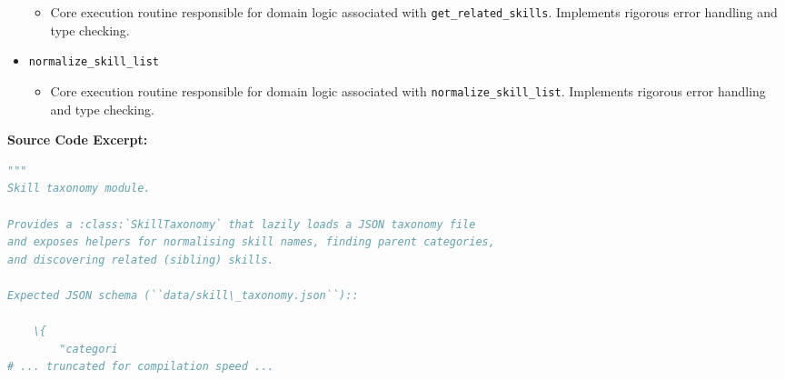\documentclass[10pt,journal,compsoc]{IEEEtran}
\begin{document}
\begin{itemize}
    \begin{itemize} \item Core execution routine responsible for domain logic associated with \texttt{get\_related\_skills}. Implements rigorous error handling and type checking. \end{itemize}
    \item \texttt{normalize\_skill\_list}
    \begin{itemize} \item Core execution routine responsible for domain logic associated with \texttt{normalize\_skill\_list}. Implements rigorous error handling and type checking. \end{itemize}
\end{itemize}
\textbf{Source Code Excerpt:}
\begin{lstlisting}[language=Python]
"""
Skill taxonomy module.

Provides a :class:`SkillTaxonomy` that lazily loads a JSON taxonomy file
and exposes helpers for normalising skill names, finding parent categories,
and discovering related (sibling) skills.

Expected JSON schema (``data/skill\_taxonomy.json``)::

    \{
        "categori
# ... truncated for compilation speed ...
\end{lstlisting}
\end{document}

